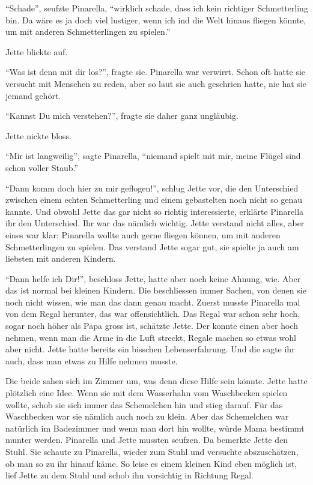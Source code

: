 \enquote{Schade}, seufzte Pinarella, \enquote{wirklich schade, dass ich kein richtiger Schmetterling bin. Da wäre es ja doch viel lustiger, wenn ich ind die Welt hinaus fliegen könnte, um mit anderen Schmetterlingen zu spielen.} 

Jette blickte auf.

\enquote{Was ist denn mit dir los?}, fragte sie. Pinarella war verwirrt. Schon oft hatte sie versucht mit Menschen zu reden, aber so laut sie auch geschrien hatte, nie hat sie jemand gehört.

\enquote{Kannst Du mich verstehen?}, fragte sie daher ganz ungläubig. 

Jette nickte bloss. 

\enquote{Mir ist langweilig}, sagte Pinarella, \enquote{niemand spielt mit mir, meine Flügel sind schon voller Staub.}

\enquote{Dann komm doch hier zu mir geflogen!}, schlug Jette vor, die den Unterschied zwischen einem echten Schmetterling und einem gebastelten noch nicht so genau kannte. Und obwohl Jette das gar nicht so richtig interessierte, erklärte Pinarella ihr den Unterschied. Ihr war das nämlich wichtig. Jette verstand nicht alles, aber eines war klar: Pinarella wollte auch gerne fliegen können, um mit anderen Schmetterlingen zu spielen. Das verstand Jette sogar gut, sie spielte ja auch am liebsten mit anderen Kindern.

\enquote{Dann helfe ich Dir!}, beschloss Jette, hatte aber noch keine Ahnung, wie. Aber das ist normal bei kleinen Kindern. Die beschliessen immer Sachen, von denen sie noch nicht wissen, wie man das dann genau macht. Zuerst musste Pinarella mal von dem Regal herunter, das war offensichtlich. Das Regal war schon sehr hoch, sogar noch höher als Papa gross ist, schätzte Jette. Der konnte einen aber hoch nehmen, wenn man die Arme in die Luft streckt, Regale machen so etwas wohl aber nicht. Jette hatte bereits ein bisschen Lebenserfahrung. Und die sagte ihr auch, dass man etwas zu Hilfe nehmen musste.

Die beide sahen sich im Zimmer um, was denn diese Hilfe sein könnte. Jette hatte plötzlich eine Idee. Wenn sie mit dem Wasserhahn vom Waschbecken spielen wollte, schob sie sich immer das Schemelchen hin und stieg darauf. Für das Waschbecken war sie nämlich auch noch zu klein. Aber das Schemelchen war natürlich im Badezimmer und wenn man dort hin wollte, würde Mama bestimmt munter werden. Pinarella und Jette mussten seufzen. Da bemerkte Jette den Stuhl. Sie schaute zu Pinarella, wieder zum Stuhl und versuchte abszuschätzen, ob man so zu ihr hinauf käme. So leise es einem kleinen Kind eben möglich ist, lief Jette zu dem Stuhl und schob ihn vorsichtig in Richtung Regal.


